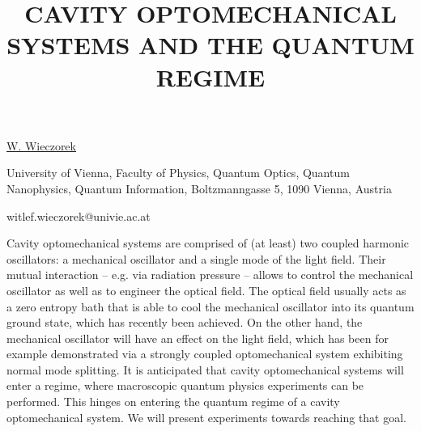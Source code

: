 \title{CAVITY OPTOMECHANICAL SYSTEMS AND THE QUANTUM REGIME}

\underline{W. Wieczorek} 

{\normalsize{\vspace{-4mm}
University of Vienna,
Faculty of Physics,
Quantum Optics, Quantum Nanophysics, Quantum Information,
Boltzmanngasse 5,
1090 Vienna,
Austria

\email witlef.wieczorek@univie.ac.at}}

Cavity optomechanical systems are comprised of (at least) two coupled harmonic oscillators: a mechanical oscillator and a single mode of the light field. Their mutual interaction -- e.g. via radiation pressure -- allows to control the mechanical oscillator as well as to engineer the optical field. The optical field usually acts as a zero entropy bath that is able to cool the mechanical oscillator into its quantum ground state, which has recently been achieved. On the other hand, the mechanical oscillator will have an effect on the light field, which has been for example demonstrated via a strongly coupled optomechanical system exhibiting normal mode splitting. It is anticipated that cavity optomechanical systems will enter a regime, where macroscopic quantum physics experiments can be performed. This hinges on entering the quantum regime of a cavity optomechanical system. We will present experiments towards reaching that goal.

\vspace{\baselineskip} 